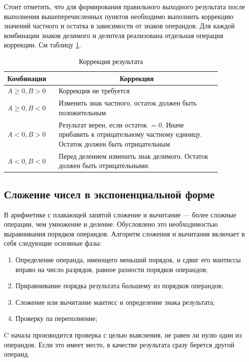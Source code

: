 \documentclass[a4paper,14pt]{extarticle}
\begin{document}
Стоит отметить, что для формирования правильного выходного результата после выполнения вышеперечисленных пунктов необходимо выполнить коррекцию значений частного и остатка в зависимости от знаков операндов. Для каждой комбинации знаков делимого и делителя реализована отдельная операция коррекции. См таблицу \ref{tab:correction4}.

\begin{table}[h!]
	\centering
	\begin{tabular}{|m{0.2\linewidth}|m{0.67\linewidth}|}
		\hline
		\textbf{Комбинация} &\multicolumn{1}{c|}{\textbf{Коррекция}}\\
		\hline
		$A\ge0, B>0 $ &Коррекция не требуется \\ 
		\hline
		$A\ge0, B<0$ & Изменить знак частного, остаток должен быть положительным\\
		\hline
		$A<0, B>0$ & Результат верен, если остаток $=0$. Иначе прибавить к отрицательному частному единицу. Остаток должен быть отрицательным\\
		\hline
		$A< 0, B< 0$ & Перед делением изменить знак делимого. Остаток должен быть отрицательными.\\
		\hline
	\end{tabular}
	\caption{Коррекция результата}
	\label{tab:correction4}
\end{table}
\subsection{Сложение чисел в экспоненциальной форме}
В арифметике с плавающей запятой сложение и вычитание — более сложные операции, чем умножение и деление. Обусловлено это необходимостью выравнивания порядков операндов. Алгоритм сложения и вычитания включает в себя следующие основные фазы:
\begin{enumerate}
	\item Определение операнда, имеющего меньший порядок, и сдвиг его мантиссы вправо на число разрядов, равное разности порядков операндов;
	\item Приравнивание порядка результата большему из порядков операндов;
	\item Сложение или вычитание мантисс и определение знака результата;
	\item Проверку па переполнение;
\end{enumerate}
C начала производится проверка с целью выяснения, не равен ли нулю один из операндов. Если это имеет место, в качестве результата сразу берется другой операнд.
\end{document}

